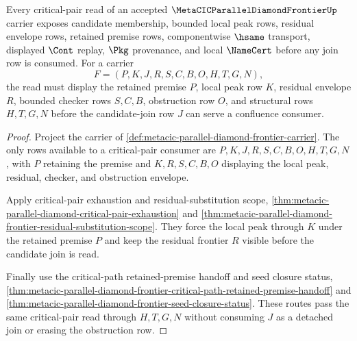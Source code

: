 \begin{theorem}
\label{thm:metacic-parallel-diamond-frontier-critical-pair-route}
Every critical-pair read of an accepted $\MetaCICParallelDiamondFrontierUp$ carrier exposes candidate membership, bounded local peak rows, residual envelope rows, retained premise rows, componentwise $\hsame$ transport, displayed $\Cont$ replay, $\Pkg$ provenance, and local $\NameCert$ before any join row is consumed. For a carrier
$$
F=(P,K,J,R,S,C,B,O,H,T,G,N),
$$
the read must display the retained premise $P$, local peak row $K$, residual envelope $R$, bounded checker rows $S,C,B$, obstruction row $O$, and structural rows $H,T,G,N$ before the candidate-join row $J$ can serve a confluence consumer.
\end{theorem}
\begin{proof}
Project the carrier of \autoref{def:metacic-parallel-diamond-frontier-carrier}. The only rows available to a critical-pair consumer are $P,K,J,R,S,C,B,O,H,T,G,N$, with $P$ retaining the premise and $K,R,S,C,B,O$ displaying the local peak, residual, checker, and obstruction envelope.

Apply critical-pair exhaustion and residual-substitution scope, \autoref{thm:metacic-parallel-diamond-critical-pair-exhaustion} and \autoref{thm:metacic-parallel-diamond-frontier-residual-substitution-scope}. They force the local peak through $K$ under the retained premise $P$ and keep the residual frontier $R$ visible before the candidate join is read.

Finally use the critical-path retained-premise handoff and seed closure status, \autoref{thm:metacic-parallel-diamond-frontier-critical-path-retained-premise-handoff} and \autoref{thm:metacic-parallel-diamond-frontier-seed-closure-status}. These routes pass the same critical-pair read through $H,T,G,N$ without consuming $J$ as a detached join or erasing the obstruction row.
\end{proof}

